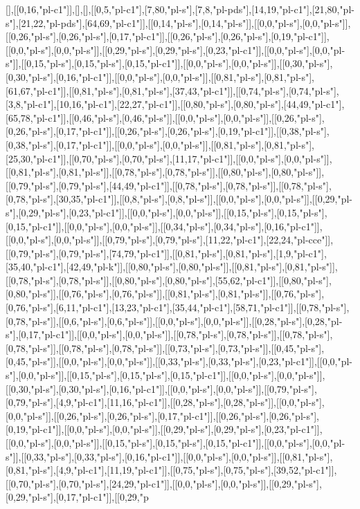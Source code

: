 [],[[0,16,"pl-c1"]],[],[],[[0,5,"pl-c1"],[7,80,"pl-s"],[7,8,"pl-pds"],[14,19,"pl-c1"],[21,80,"pl-s"],[21,22,"pl-pds"],[64,69,"pl-c1"]],[[0,14,"pl-s"],[0,14,"pl-s"]],[[0,0,"pl-s"],[0,0,"pl-s"]],[[0,26,"pl-s"],[0,26,"pl-s"],[0,17,"pl-c1"]],[[0,26,"pl-s"],[0,26,"pl-s"],[0,19,"pl-c1"]],[[0,0,"pl-s"],[0,0,"pl-s"]],[[0,29,"pl-s"],[0,29,"pl-s"],[0,23,"pl-c1"]],[[0,0,"pl-s"],[0,0,"pl-s"]],[[0,15,"pl-s"],[0,15,"pl-s"],[0,15,"pl-c1"]],[[0,0,"pl-s"],[0,0,"pl-s"]],[[0,30,"pl-s"],[0,30,"pl-s"],[0,16,"pl-c1"]],[[0,0,"pl-s"],[0,0,"pl-s"]],[[0,81,"pl-s"],[0,81,"pl-s"],[61,67,"pl-c1"]],[[0,81,"pl-s"],[0,81,"pl-s"],[37,43,"pl-c1"]],[[0,74,"pl-s"],[0,74,"pl-s"],[3,8,"pl-c1"],[10,16,"pl-c1"],[22,27,"pl-c1"]],[[0,80,"pl-s"],[0,80,"pl-s"],[44,49,"pl-c1"],[65,78,"pl-c1"]],[[0,46,"pl-s"],[0,46,"pl-s"]],[[0,0,"pl-s"],[0,0,"pl-s"]],[[0,26,"pl-s"],[0,26,"pl-s"],[0,17,"pl-c1"]],[[0,26,"pl-s"],[0,26,"pl-s"],[0,19,"pl-c1"]],[[0,38,"pl-s"],[0,38,"pl-s"],[0,17,"pl-c1"]],[[0,0,"pl-s"],[0,0,"pl-s"]],[[0,81,"pl-s"],[0,81,"pl-s"],[25,30,"pl-c1"]],[[0,70,"pl-s"],[0,70,"pl-s"],[11,17,"pl-c1"]],[[0,0,"pl-s"],[0,0,"pl-s"]],[[0,81,"pl-s"],[0,81,"pl-s"]],[[0,78,"pl-s"],[0,78,"pl-s"]],[[0,80,"pl-s"],[0,80,"pl-s"]],[[0,79,"pl-s"],[0,79,"pl-s"],[44,49,"pl-c1"]],[[0,78,"pl-s"],[0,78,"pl-s"]],[[0,78,"pl-s"],[0,78,"pl-s"],[30,35,"pl-c1"]],[[0,8,"pl-s"],[0,8,"pl-s"]],[[0,0,"pl-s"],[0,0,"pl-s"]],[[0,29,"pl-s"],[0,29,"pl-s"],[0,23,"pl-c1"]],[[0,0,"pl-s"],[0,0,"pl-s"]],[[0,15,"pl-s"],[0,15,"pl-s"],[0,15,"pl-c1"]],[[0,0,"pl-s"],[0,0,"pl-s"]],[[0,34,"pl-s"],[0,34,"pl-s"],[0,16,"pl-c1"]],[[0,0,"pl-s"],[0,0,"pl-s"]],[[0,79,"pl-s"],[0,79,"pl-s"],[11,22,"pl-c1"],[22,24,"pl-cce"]],[[0,79,"pl-s"],[0,79,"pl-s"],[74,79,"pl-c1"]],[[0,81,"pl-s"],[0,81,"pl-s"],[1,9,"pl-c1"],[35,40,"pl-c1"],[42,49,"pl-k"]],[[0,80,"pl-s"],[0,80,"pl-s"]],[[0,81,"pl-s"],[0,81,"pl-s"]],[[0,78,"pl-s"],[0,78,"pl-s"]],[[0,80,"pl-s"],[0,80,"pl-s"],[55,62,"pl-c1"]],[[0,80,"pl-s"],[0,80,"pl-s"]],[[0,76,"pl-s"],[0,76,"pl-s"]],[[0,81,"pl-s"],[0,81,"pl-s"]],[[0,76,"pl-s"],[0,76,"pl-s"],[6,11,"pl-c1"],[13,23,"pl-c1"],[35,44,"pl-c1"],[58,71,"pl-c1"]],[[0,78,"pl-s"],[0,78,"pl-s"]],[[0,6,"pl-s"],[0,6,"pl-s"]],[[0,0,"pl-s"],[0,0,"pl-s"]],[[0,28,"pl-s"],[0,28,"pl-s"],[0,17,"pl-c1"]],[[0,0,"pl-s"],[0,0,"pl-s"]],[[0,78,"pl-s"],[0,78,"pl-s"]],[[0,78,"pl-s"],[0,78,"pl-s"]],[[0,78,"pl-s"],[0,78,"pl-s"]],[[0,73,"pl-s"],[0,73,"pl-s"]],[[0,45,"pl-s"],[0,45,"pl-s"]],[[0,0,"pl-s"],[0,0,"pl-s"]],[[0,33,"pl-s"],[0,33,"pl-s"],[0,23,"pl-c1"]],[[0,0,"pl-s"],[0,0,"pl-s"]],[[0,15,"pl-s"],[0,15,"pl-s"],[0,15,"pl-c1"]],[[0,0,"pl-s"],[0,0,"pl-s"]],[[0,30,"pl-s"],[0,30,"pl-s"],[0,16,"pl-c1"]],[[0,0,"pl-s"],[0,0,"pl-s"]],[[0,79,"pl-s"],[0,79,"pl-s"],[4,9,"pl-c1"],[11,16,"pl-c1"]],[[0,28,"pl-s"],[0,28,"pl-s"]],[[0,0,"pl-s"],[0,0,"pl-s"]],[[0,26,"pl-s"],[0,26,"pl-s"],[0,17,"pl-c1"]],[[0,26,"pl-s"],[0,26,"pl-s"],[0,19,"pl-c1"]],[[0,0,"pl-s"],[0,0,"pl-s"]],[[0,29,"pl-s"],[0,29,"pl-s"],[0,23,"pl-c1"]],[[0,0,"pl-s"],[0,0,"pl-s"]],[[0,15,"pl-s"],[0,15,"pl-s"],[0,15,"pl-c1"]],[[0,0,"pl-s"],[0,0,"pl-s"]],[[0,33,"pl-s"],[0,33,"pl-s"],[0,16,"pl-c1"]],[[0,0,"pl-s"],[0,0,"pl-s"]],[[0,81,"pl-s"],[0,81,"pl-s"],[4,9,"pl-c1"],[11,19,"pl-c1"]],[[0,75,"pl-s"],[0,75,"pl-s"],[39,52,"pl-c1"]],[[0,70,"pl-s"],[0,70,"pl-s"],[24,29,"pl-c1"]],[[0,0,"pl-s"],[0,0,"pl-s"]],[[0,29,"pl-s"],[0,29,"pl-s"],[0,17,"pl-c1"]],[[0,29,"p